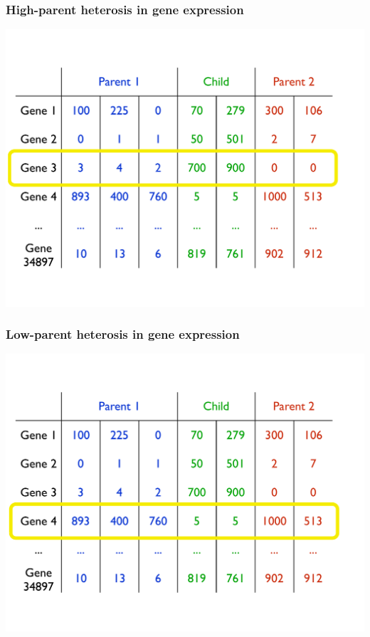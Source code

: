 \documentclass[handout]{beamer}
\numberwithin{equation}{section}
\begin{document}
\begin{frame}
\frametitle{High-parent heterosis in gene expression}
\begin{center}
\includegraphics[scale=.35]{fig/hphrnaseq}
\end{center}
\end{frame}

\begin{frame}
\frametitle{Low-parent heterosis in gene expression}
\begin{center}
\includegraphics[scale=.35]{fig/lphrnaseq}
\end{center}
\end{frame}
\end{document}
